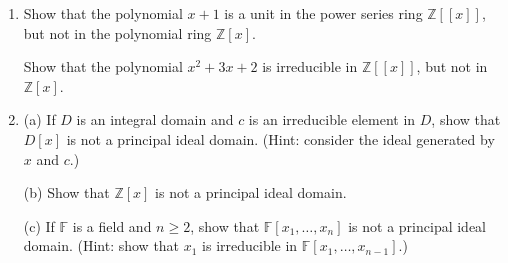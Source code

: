 \documentclass[12pt]{article}
\newcommand{\FF}{{\mathbb F}}
\newcommand{\ZZ}{{\mathbb Z}}
\begin{document}
\begin{enumerate}
   
\item     Show that the polynomial $x+1$ is a unit in the power series ring $\ZZ[[x]]$, but not in the polynomial ring $\ZZ[x]$.

   Show that the polynomial $x^2+3x+2$ is irreducible in  $\ZZ[[x]]$, but not in  $\ZZ[x]$.


%
\item 
 (a) If $D$ is an integral domain and $c$ is an irreducible element in $D$, show that $D[x]$ is not a principal ideal domain.
  (Hint: consider the ideal generated by $x$ and $c$.)

  (b) Show that $\ZZ[x]$ is not a principal ideal domain.

  (c) If $\FF$ is a field and $n\geq 2$, show that $\FF[x_1,\dotsc,x_n]$ is not a principal ideal domain.
      (Hint: show that $x_1$ is irreducible in $\FF[x_1,\dotsc,x_{n-1}]$.)
\vspace{-2pt}


\end{enumerate}
\end{document}
